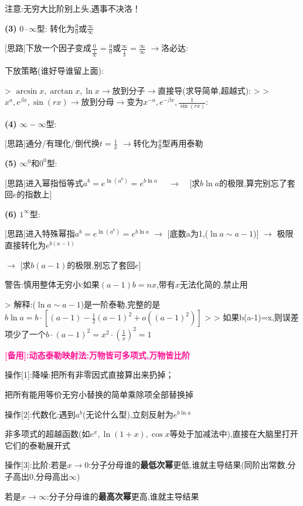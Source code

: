 \documentclass[11pt,a4paper,UTF8]{ctexart}
\begin{document}
\begin{thmbox}[{解法[6]: [微分]7种未定式计算}]
  注意:无穷大比阶别上头,遇事不决洛！

\textbf{(3)} $0 \cdot \infty$型: 转化为$\frac{0}{0}$或$\frac{\infty}{\infty}$

  [思路]下放一个因子变成$\frac{0}{\frac{1}{\infty}} = \frac{0}{0}$或$\frac{\infty}{\frac{1}{0}} = \frac{\infty}{\infty}$ $\to$洛必达:

  下放策略(谁好导谁留上面):

  >   $\arcsin x, \arctan x, \ln x \to$放到分子$\to$直接导(求导简单,超越式):
  >
  >   $x^a, e^{\beta x}, \sin(rx) \to$放到分母$\to$变为$x^{-a}, e^{-\beta x}, \frac{1}{\sin(rx)}$:

\textbf{(4)} $\infty - \infty$型:

  [思路]通分/有理化/倒代换$t = \frac{1}{x}$ $\to$转化为$\frac{0}{0}$型再用泰勒

\textbf{(5)} $\infty^0$和$0^0$型:

  [思路]进入幂指恒等式$a^b = e^{\ln(a^b)} = e^{b \ln a}$ $\quad\to\quad$[求$b \ln a$的极限,算完别忘了套回$e$的指数上]

\textbf{(6)} $1^\infty$型:

  [思路]进入特殊幂指$a^b = e^{\ln(a^b)} = e^{b \ln a}$ $\to$ [底数a为1,($\ln a \sim a - 1$)] $\to$ 极限直接转化为$e^{b(a-1)}$

  				  $\to$ [求$b(a-1)$的极限,别忘了套回$e$]

  警告:慎用整体无穷小:如果$(a-1)b = nx$,带有$x$无法化简的,禁止用

  >   解释:($\ln a \sim a - 1$)是一阶泰勒,完整的是$b \ln a = b \cdot [(a-1) - \frac{1}{2}(a-1)^2 + o((a-1)^2)]$
  >
  >   如果b(a-1)=x,则误差项少了一个$b \cdot (a-1)^2 = x^2 \cdot (\frac{1}{x})^2 = 1$

\textbf{\textcolor{DeepPink}{[备用]:动态泰勒映射法:万物皆可多项式,万物皆比阶}}

操作[1]:降噪:把所有非零因式直接算出来扔掉；

    把所有能用等价无穷小替换的简单乘除项全部替换掉

操作[2]:代数化:遇到$a^b$(无论什么型),立刻反射为$e^{b \ln a}$

      非多项式的超越函数(如$e^x, \ln(1+x), \cos x$等处于加减法中),直接在大脑里打开它们的泰勒展开式

操作[3]:比阶:若是$x \to 0$:分子分母谁的\textbf{最低次幂}更低,谁就主导结果(同阶出常数,分子高出$0$,分母高出$\infty$)

          若是$x \to \infty$:分子分母谁的\textbf{最高次幂}更高,谁就主导结果



\end{thmbox}
\end{document}
